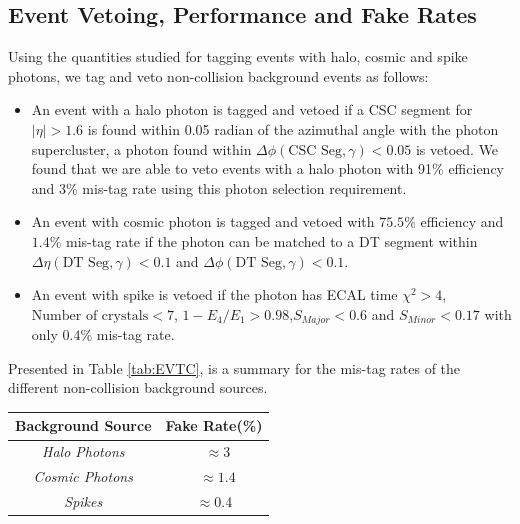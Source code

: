 \subsection{Event Vetoing, Performance and Fake Rates}
Using the quantities studied for tagging events with halo, cosmic and spike photons, we tag and veto non-collision background  events as follows: 
\begin{itemize}
\item An event with a halo photon is tagged and vetoed if a CSC segment for $|\eta| > 1.6$ is found within 0.05 radian of the azimuthal angle with the photon supercluster, \ie a photon found within $\Delta\phi(\mbox{CSC Seg},\gamma) < 0.05$ is vetoed. We found that we are able to veto events with a  halo photon with 91\% efficiency and 3\% mis-tag rate using this photon selection requirement.
\item An event with cosmic photon is tagged and vetoed with $75.5$\% efficiency and $1.4$\% mis-tag rate if the photon can be matched to a DT segment within $\Delta\eta(\mbox{DT Seg},\gamma) < 0.1$ and $\Delta\phi(\mbox{DT Seg},\gamma) < 0.1$.
\item An event with spike is vetoed if the photon has ECAL time $\chi^{2} > 4$, $\mbox{Number of crystals} < 7$, $ 1-E_{4}/E_{1} > 0.98$,$S_{Major} < 0.6$ and $S_{Minor} < 0.17$ with only $0.4$\% mis-tag rate.
\end{itemize}
Presented in Table \ref{tab:EVTC}, is a summary for the mis-tag rates of the different non-collision background sources. 

\begin{minipage}{0.90\linewidth} 
\begin{center}
\begin{tabular}{|c| c|}
\hline
\bfseries{Background Source} & \bfseries {Fake Rate}(\%)\\
\hline\hline
\textit{Halo Photons} & ~$\approx 3$ \\
\textit{Cosmic Photons} & ~$\approx 1.4$ \\
\textit{Spikes} & $\approx 0.4$ \\
\hline
\end{tabular}
\label{tab:EVTC} 
\end{center}
\end{minipage}

